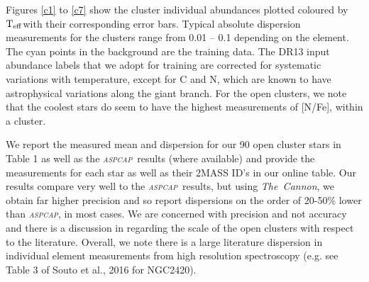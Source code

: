 \documentclass[14pt, preprint2]{aastex6}
\newcommand{\project}[1]{\textsl{#1}}
\newcommand{\tc}{\project{The~Cannon}}
\newcommand{\aspcap}{\project{\textsc{aspcap}}}
\newcommand{\teff}{\mbox{$\rm T_{eff}$}}
\begin{document}
Figures \ref{c1} to \ref{c7} show the cluster individual abundances plotted coloured by \teff with their corresponding error bars. Typical absolute dispersion measurements for the clusters range from 0.01 -- 0.1 depending on the element.  The cyan points in the background are the training data. The DR13 input abundance labels that we adopt for training are corrected for systematic variations with temperature, except for C and N, which are known to have astrophysical variations along the giant branch. For the open clusters, we note that the coolest stars do seem to have the highest measurements of [N/Fe], within a cluster. 

We report the measured mean and dispersion for our 90 open cluster stars in Table 1 as well as the \aspcap\ results (where available) and provide the measurements for each star as well as their 2MASS ID's in our online table. Our results compare very well to the \aspcap\ results, but using \tc, we obtain far higher precision and so report dispersions on the order of 20-50\% lower than \aspcap, in most cases. We are concerned with precision and not accuracy and there is a discussion in \citet{Holtzman2016} regarding the scale of the open clusters with respect to the literature. Overall, we note there is a large literature dispersion in individual element measurements from high resolution spectroscopy (e.g. see Table 3 of Souto et al., 2016 for NGC2420). 
\end{document}

